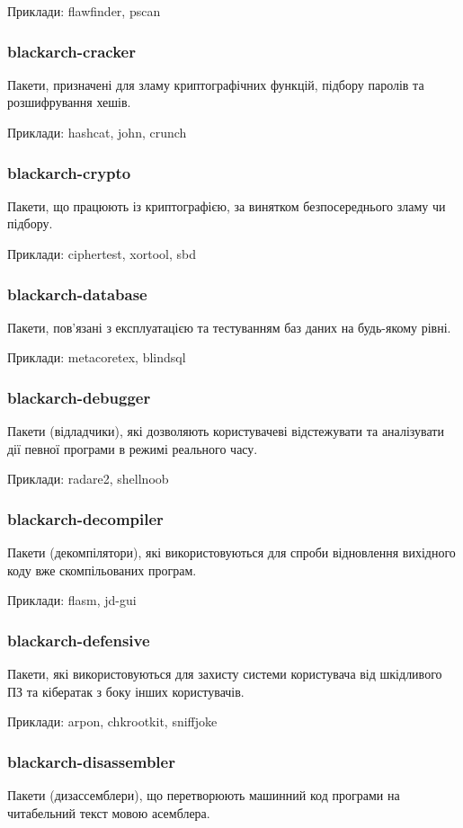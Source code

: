 \documentclass[a4paper, oneside, 11pt]{book}
\begin{document}
Приклади: flawfinder, pscan

\subsubsection{blackarch-cracker}
Пакети, призначені для зламу криптографічних функцій, підбору паролів та розшифрування хешів.

Приклади: hashcat, john, crunch

\subsubsection{blackarch-crypto}
Пакети, що працюють із криптографією, за винятком безпосереднього зламу чи підбору.

Приклади: ciphertest, xortool, sbd

\subsubsection{blackarch-database}
Пакети, пов'язані з експлуатацією та тестуванням баз даних на будь-якому рівні.

Приклади: metacoretex, blindsql

\subsubsection{blackarch-debugger}
Пакети (відладчики), які дозволяють користувачеві відстежувати та аналізувати дії певної програми в режимі реального часу.

Приклади: radare2, shellnoob

\subsubsection{blackarch-decompiler}
Пакети (декомпілятори), які використовуються для спроби відновлення вихідного коду вже скомпільованих програм.

Приклади: flasm, jd-gui

\subsubsection{blackarch-defensive}
Пакети, які використовуються для захисту системи користувача від шкідливого ПЗ та кібератак з боку інших користувачів.

Приклади: arpon, chkrootkit, sniffjoke

\subsubsection{blackarch-disassembler}
Пакети (дизассемблери), що перетворюють машинний код програми на читабельний текст мовою асемблера.
\end{document}
